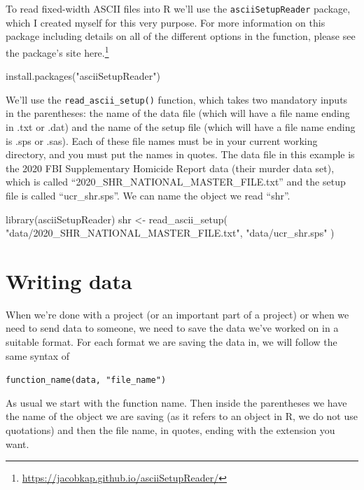 \documentclass[
  a4paper,
]{krantz}
\makeatletter
\newenvironment{Shaded}{\begin{snugshade}}{\end{snugshade}}
\newcommand{\FunctionTok}[1]{\textcolor[rgb]{0.00,0.00,0.00}{#1}}
\newcommand{\NormalTok}[1]{#1}
\newcommand{\OtherTok}[1]{\textcolor[rgb]{0.56,0.35,0.01}{#1}}
\newcommand{\StringTok}[1]{\textcolor[rgb]{0.31,0.60,0.02}{#1}}
\renewcommand{\href}[2]{#2\footnote{\url{#1}}}
\newenvironment{kframe}{%
\medskip{}
\setlength{\fboxsep}{.8em}
 \def\at@end@of@kframe{}%
 \ifinner\ifhmode%
  \def\at@end@of@kframe{\end{minipage}}%
  \begin{minipage}{\columnwidth}%
 \fi\fi%
 \def\FrameCommand##1{\hskip\@totalleftmargin \hskip-\fboxsep
 \colorbox{shadecolor}{##1}\hskip-\fboxsep
     \hskip-\linewidth \hskip-\@totalleftmargin \hskip\columnwidth}%
 \MakeFramed {\advance\hsize-\width
   \@totalleftmargin\z@ \linewidth\hsize
   \@setminipage}}%
 {\par\unskip\endMakeFramed%
 \at@end@of@kframe}
\renewenvironment{Shaded}{\begin{kframe}}{\end{kframe}}
\makeatother
\begin{document}
To read fixed-width ASCII files into R we'll use the
\texttt{asciiSetupReader} package, which I created myself
for this very purpose. For more information on this package
including details on all of the different options in the
function, please see the package's site
\href{https://jacobkap.github.io/asciiSetupReader/}{here.}

\begin{Shaded}
\begin{Highlighting}[]
\FunctionTok{install.packages}\NormalTok{(}\StringTok{"asciiSetupReader"}\NormalTok{)}
\end{Highlighting}
\end{Shaded}

We'll use the \texttt{read\_ascii\_setup()} function, which
takes two mandatory inputs in the parentheses: the name of
the data file (which will have a file name ending in .txt or
.dat) and the name of the setup file (which will have a file
name ending is .sps or .sas). Each of these file names must
be in your current working directory, and you must put the
names in quotes. The data file in this example is the 2020
FBI Supplementary Homicide Report data (their murder data
set), which is called
``2020\_SHR\_NATIONAL\_MASTER\_FILE.txt'' and the setup file
is called ``ucr\_shr.sps''. We can name the object we read
``shr''.

\begin{Shaded}
\begin{Highlighting}[]
\FunctionTok{library}\NormalTok{(asciiSetupReader)}
\NormalTok{shr }\OtherTok{\textless{}{-}} \FunctionTok{read\_ascii\_setup}\NormalTok{(}
  \StringTok{"data/2020\_SHR\_NATIONAL\_MASTER\_FILE.txt"}\NormalTok{,}
  \StringTok{"data/ucr\_shr.sps"}
\NormalTok{)}
\end{Highlighting}
\end{Shaded}

\hypertarget{writing-data}{%
\section{Writing data}\label{writing-data}}

When we're done with a project (or an important part of a
project) or when we need to send data to someone, we need to
save the data we've worked on in a suitable format. For each
format we are saving the data in, we will follow the same
syntax of

\texttt{function\_name(data,\ "file\_name")}

As usual we start with the function name. Then inside the
parentheses we have the name of the object we are saving (as
it refers to an object in R, we do not use quotations) and
then the file name, in quotes, ending with the extension you
want.
\end{document}
